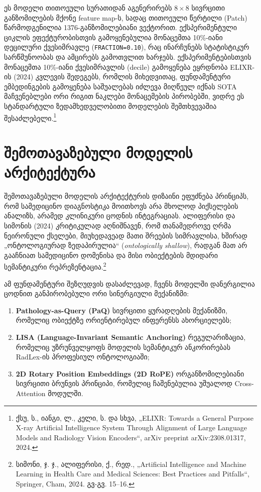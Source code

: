 \documentclass[12pt,a4paper,oneside]{report}
\begin{document}
ეს მოდელი თითოეული სურათიდან აგენერირებს $8 \times 8$ სივრცითი განზომილების მქონე feature map-ს, სადაც თითოეული წერტილი (Patch) წარმოდგენილია 1376-განზომილებიანი ვექტორით. ექსპერიმენტული ციკლის ეფექტურობისთვის გამოყენებულია მონაცემთა 10\%-იანი დეცილური ქვესიმრავლე (\texttt{FRACTION=0.10}), რაც ინარჩუნებს სტატისტიკურ სარწმუნოობას და ამცირებს გამოთვლით ხარჯებს. ექსპერიმენტებისთვის მონაცემთა 10\%-იანი ქვესიმრავლის (decile) გამოყენება ეყრდნობა ELIXR-ის (2024) კვლევის შედეგებს, რომლის მიხედვითაც, ფუნდამენტური ემბედინგების გამოყენება საშუალებას იძლევა მიღწეულ იქნას SOTA მაჩვენებლები ორი რიგით ნაკლები მონაცემების პირობებში, ვიდრე ეს სტანდარტული ზედამხედველობითი მოდელების შემთხვევაშია შესაძლებელი.\footnote{ქსუ, ს., იანგი, ლ., კელი, ს. და სხვა, „ELIXR: Towards a General Purpose X-ray Artificial Intelligence System Through Alignment of Large Language Models and Radiology Vision Encoders“, arXiv preprint arXiv:2308.01317, 2024.}

\section{შემოთავაზებული მოდელის არქიტექტურა}
შემოთავაზებული მოდელის არქიტექტურის დიზაინი ეფუძნება პრინციპს, რომ სამედიცინო დიაგნოსტიკა მოითხოვს არა მხოლოდ პიქსელების ანალიზს, არამედ კლინიკური ცოდნის ინტეგრაციას. ალიფერისი და სიმონის (2024) კრიტიკულად აღნიშნავენ, რომ თანამედროვე ღრმა ნეირონული ქსელები, მიუხედავეად მათი შრეების სიმრავლისა, ხშირად „ონტოლოგიურად ზედაპირულია“ (\textit{ontologically shallow}), რადგან მათ არ გააჩნიათ სამედიცინო დომენისა და მისი ობიექტების მდიდარი სემანტიკური რეპრეზენტაცია.\footnote{სიმონი, ჯ. ჯ., ალიფერისი, ქ., რედ., „Artificial Intelligence and Machine Learning in Health Care and Medical Sciences: Best Practices and Pitfalls“, Springer, Cham, 2024. გვ-გვ. 15–16.} 

ამ ფუნდამენტური შეზღუდვის დასაძლევად, ჩვენს მოდელში დანერგილია ცოდნით განპირობებული ორი სინერგიული მექანიზმი: 
\begin{enumerate}
    \item \textbf{Pathology-as-Query (PaQ)} სივრცითი ყურადღების მექანიზმი, რომელიც ობიექტზე ორიენტირებულ ინფერენსს ახორციელებს;
    \item \textbf{LISA (Language-Invariant Semantic Anchoring)} რეგულარიზაცია, რომელიც უზრუნველყოფს მოდელის სემანტიკურ ანკორირებას RadLex-ის პროფესიულ ონტოლოგიაში;
    \item \textbf{2D Rotary Position Embeddings (2D RoPE)} ორგანზომილებიანი სივრცითი ბრუნვის პრინციპი, რომელიც ჩაშენებულია უშუალოდ Cross-Attention მოდულში.
\end{enumerate}
\end{document}
